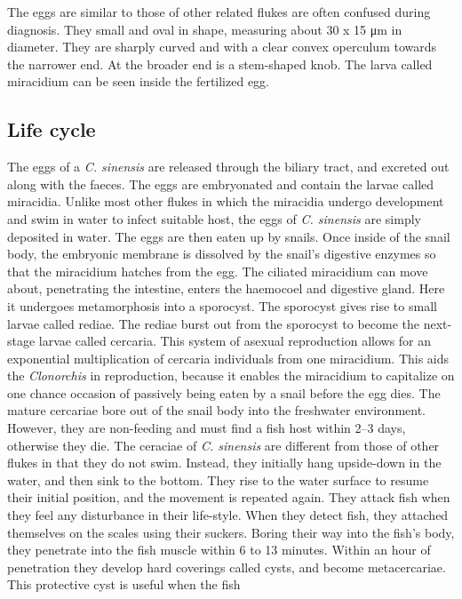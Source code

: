 \documentclass[]{book}
\theoremstyle{definition}
\theoremstyle{definition}
\theoremstyle{definition}
\theoremstyle{remark}
\begin{document}
The eggs are similar to those of other related flukes are often confused
during diagnosis. They small and oval in shape, measuring about 30 x 15
μm in diameter. They are sharply curved and with a clear convex
operculum towards the narrower end. At the broader end is a stem-shaped
knob. The larva called miracidium can be seen inside the fertilized egg.

\subsection{Life cycle}\label{life-cycle-3}

The eggs of a \emph{C. sinensis} are released through the biliary tract,
and excreted out along with the faeces. The eggs are embryonated and
contain the larvae called miracidia. Unlike most other flukes in which
the miracidia undergo development and swim in water to infect suitable
host, the eggs of \emph{C. sinensis} are simply deposited in water. The eggs
are then eaten up by snails. Once inside of the snail body, the
embryonic membrane is dissolved by the snail's digestive enzymes so that
the miracidium hatches from the egg. The ciliated miracidium can move
about, penetrating the intestine, enters the haemocoel and digestive
gland. Here it undergoes metamorphosis into a sporocyst. The sporocyst
gives rise to small larvae called rediae. The rediae burst out from the
sporocyst to become the next-stage larvae called cercaria. This system
of asexual reproduction allows for an exponential multiplication of
cercaria individuals from one miracidium. This aids the \emph{Clonorchis} in
reproduction, because it enables the miracidium to capitalize on one
chance occasion of passively being eaten by a snail before the egg dies.
The mature cercariae bore out of the snail body into the freshwater
environment. However, they are non-feeding and must find a fish host
within 2--3 days, otherwise they die. The ceraciae of \emph{C. sinensis} are
different from those of other flukes in that they do not swim. Instead,
they initially hang upside-down in the water, and then sink to the
bottom. They rise to the water surface to resume their initial position,
and the movement is repeated again. They attack fish when they feel any
disturbance in their life-style. When they detect fish, they attached
themselves on the scales using their suckers. Boring their way into the
fish's body, they penetrate into the fish muscle within 6 to 13 minutes.
Within an hour of penetration they develop hard coverings called cysts,
and become metacercariae. This protective cyst is useful when the fish
\end{document}
